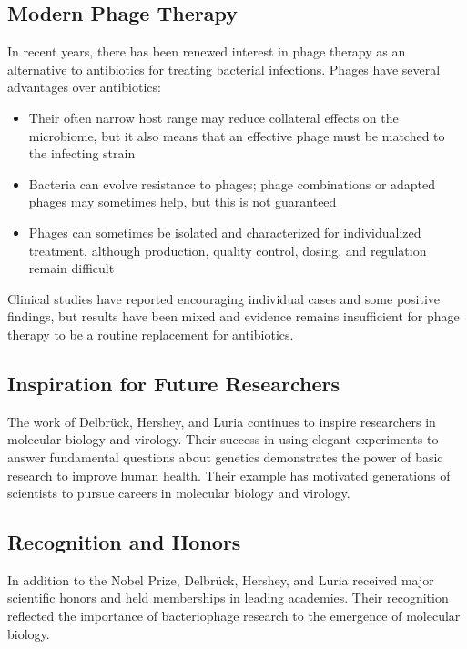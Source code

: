 \subsection{Modern Phage Therapy}

In recent years, there has been renewed interest in phage therapy as an alternative to antibiotics for treating bacterial infections. Phages have several advantages over antibiotics:

\begin{itemize}
\item Their often narrow host range may reduce collateral effects on the microbiome, but it also means that an effective phage must be matched to the infecting strain
\item Bacteria can evolve resistance to phages; phage combinations or adapted phages may sometimes help, but this is not guaranteed
\item Phages can sometimes be isolated and characterized for individualized treatment, although production, quality control, dosing, and regulation remain difficult
\end{itemize}

Clinical studies have reported encouraging individual cases and some positive findings, but results have been mixed and evidence remains insufficient for phage therapy to be a routine replacement for antibiotics.

\subsection{Inspiration for Future Researchers}

The work of Delbr\"uck, Hershey, and Luria continues to inspire researchers in molecular biology and virology. Their success in using elegant experiments to answer fundamental questions about genetics demonstrates the power of basic research to improve human health. Their example has motivated generations of scientists to pursue careers in molecular biology and virology.

\subsection{Recognition and Honors}

In addition to the Nobel Prize, Delbr\"uck, Hershey, and Luria received major scientific honors and held memberships in leading academies. Their recognition reflected the importance of bacteriophage research to the emergence of molecular biology.

